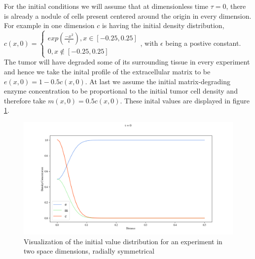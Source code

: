 For the initial conditions we will assume that at dimensionless time $\tau = 0$, there is already a nodule of cells present centered around the origin in every dimension. For example in one dimension $c$ is having the initial density distribution,
$c(x,0)=
\begin{cases}
exp(\frac{-x^2}{\epsilon}), x\in [-0.25, 0.25]\\
0, x\notin [-0.25,0.25]
\end{cases}
$, with $\epsilon$ being a postive constant. 
The tumor will have degraded some of its surrounding tissue in every experiment and hence we take the inital profile of the extracellular matrix to be $e(x,0) = 1 - 0.5 c(x,0)$. At last we assume the initial matrix-degrading enzyme concentration to be proportional to the initial tumor cell density and therefore take $m(x,0) = 0.5 c(x,0)$. These inital values are displayed in figure \ref{fig:Initial_Value_Distribution}.
\begin{figure}
    \centering
    \includegraphics[width=\textwidth]{resources/images/inital_value_plot_figure.png}
    \caption{Visualization of the initial value distribution for an experiment in two space dimensions, radially symmetrical}
    \label{fig:Initial_Value_Distribution}
\end{figure}

